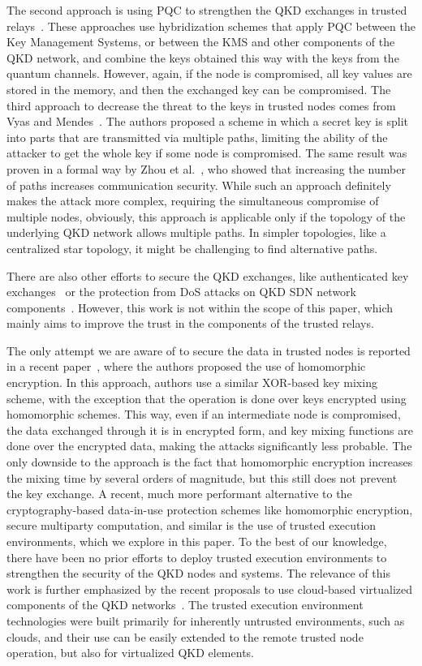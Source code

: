 \documentclass[futureinternet,article,submit,moreauthors]{Definitions/mdpi}
\begin{document}
The second approach is using PQC to strengthen the QKD exchanges in trusted relays~\cite{james_key_2023,braun_hybrid_2023}. These approaches use hybridization schemes that apply PQC between the Key Management Systems, or between the KMS and other components of the QKD network, and combine the keys obtained this way with the keys from the quantum channels. However, again, if the node is compromised, all key values are stored in the memory, and then the exchanged key can be compromised. The third approach to decrease the threat to the keys in trusted nodes comes from Vyas and Mendes~\cite{vyas_relaxing_2024}. The authors proposed a scheme in which a secret key is split into parts that are transmitted via multiple paths, limiting the ability of the attacker to get the whole key if some node is compromised. The same result was proven in a formal way by Zhou et al.~\cite{zhou_quantum_2022}, who showed that increasing the number of paths increases communication security. While such an approach definitely makes the attack more complex, requiring the simultaneous compromise of multiple nodes, obviously, this approach is applicable only if the topology of the underlying QKD network allows multiple paths. In simpler topologies, like a centralized star topology, it might be challenging to find alternative paths.

There are also other efforts to secure the QKD exchanges, like authenticated key exchanges~\cite{bruckner_muckle_2023} or the protection from DoS attacks on QKD SDN network components~\cite{mehic_tackling_2022}. However, this work is not within the scope of this paper, which mainly aims to improve the trust in the components of the trusted relays.

The only attempt we are aware of to secure the data in trusted nodes is reported in a recent paper~\cite{brazaola-vicario_privacy_2026}, where the authors proposed the use of homomorphic encryption. In this approach, authors use a similar XOR-based key mixing scheme, with the exception that the operation is done over keys encrypted using homomorphic schemes. This way, even if an intermediate node is compromised, the data exchanged through it is in encrypted form, and key mixing functions are done over the encrypted data, making the attacks significantly less probable. The only downside to the approach is the fact that homomorphic encryption increases the mixing time by several orders of magnitude, but this still does not prevent the key exchange. A recent, much more performant alternative to the cryptography-based data-in-use protection schemes like homomorphic encryption, secure multiparty computation, and similar is the use of trusted execution environments, which we explore in this paper. To the best of our knowledge, there have been no prior efforts to deploy trusted execution environments to strengthen the security of the QKD nodes and systems. The relevance of this work is further emphasized by the recent proposals to use cloud-based virtualized components of the QKD networks~\cite{lopez_enhanced_2025}. The trusted execution environment technologies were built primarily for inherently untrusted environments, such as clouds, and their use can be easily extended to the remote trusted node operation, but also for virtualized QKD elements.
\end{document}
